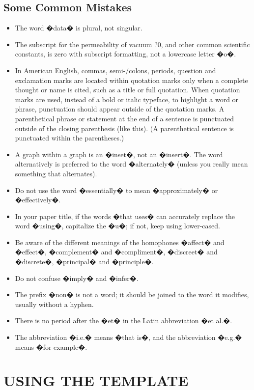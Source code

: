 \documentclass[letterpaper, 10 pt, conference]{ieeeconf}  %
\begin{document}
\subsection{Some Common Mistakes}
\begin{itemize}


\item The word �data� is plural, not singular.
\item The subscript for the permeability of vacuum ?0, and other common scientific constants, is zero with subscript formatting, not a lowercase letter �o�.
\item In American English, commas, semi-/colons, periods, question and exclamation marks are located within quotation marks only when a complete thought or name is cited, such as a title or full quotation. When quotation marks are used, instead of a bold or italic typeface, to highlight a word or phrase, punctuation should appear outside of the quotation marks. A parenthetical phrase or statement at the end of a sentence is punctuated outside of the closing parenthesis (like this). (A parenthetical sentence is punctuated within the parentheses.)
\item A graph within a graph is an �inset�, not an �insert�. The word alternatively is preferred to the word �alternately� (unless you really mean something that alternates).
\item Do not use the word �essentially� to mean �approximately� or �effectively�.
\item In your paper title, if the words �that uses� can accurately replace the word �using�, capitalize the �u�; if not, keep using lower-cased.
\item Be aware of the different meanings of the homophones �affect� and �effect�, �complement� and �compliment�, �discreet� and �discrete�, �principal� and �principle�.
\item Do not confuse �imply� and �infer�.
\item The prefix �non� is not a word; it should be joined to the word it modifies, usually without a hyphen.
\item There is no period after the �et� in the Latin abbreviation �et al.�.
\item The abbreviation �i.e.� means �that is�, and the abbreviation �e.g.� means �for example�.

\end{itemize}


\section{USING THE TEMPLATE}
\end{document}
